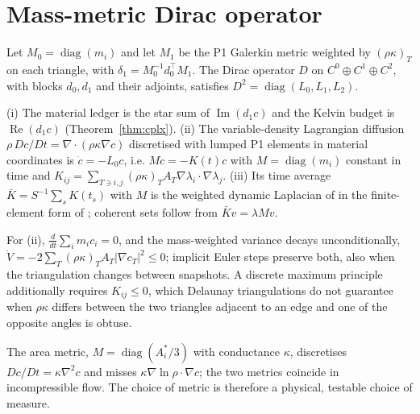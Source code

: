 \documentclass[11pt]{article}
\theoremstyle{definition}\newtheorem{definition}{Definition}\theoremstyle{remark}\newtheorem{remark}{Remark}
\newcommand{\im}{\operatorname{Im}}\newcommand{\re}{\operatorname{Re}}
\begin{document}
\section{Mass-metric Dirac operator}\label{sec:dirac}
Let $M_0=\operatorname{diag}(m_i)$ and let $M_1$ be the P1 Galerkin metric weighted by $(\rho\kappa)_T$ on each triangle, with $\delta_1=M_0^{-1}d_0^\top M_1$. The Dirac operator $D$ on $C^0\oplus C^1\oplus C^2$, with blocks $d_0,d_1$ and their adjoints, satisfies $D^2=\operatorname{diag}(L_0,L_1,L_2)$.
\begin{proposition}\label{prop:blocks}
(i) The material ledger is the star sum of $\im(d_1c)$ and the Kelvin budget is $\re(d_1c)$ (Theorem~\ref{thm:cplx}). (ii) The variable-density Lagrangian diffusion $\rho\,Dc/Dt=\nabla\cdot(\rho\kappa\nabla c)$ discretised with lumped P1 elements in material coordinates is $\dot c=-L_0c$, i.e. $M\dot c=-K(t)c$ with $M=\operatorname{diag}(m_i)$ constant in time and $K_{ij}=\sum_{T\ni i,j}(\rho\kappa)_TA_T\nabla\lambda_i\cdot\nabla\lambda_j$. (iii) Its time average $\bar K=S^{-1}\sum_sK(t_s)$ with $M$ is the weighted dynamic Laplacian of \citep{FroylandKwok2020} in the finite-element form of \citep{FroylandJunge2018}; coherent sets follow from $\bar Kv=\lambda Mv$.
\end{proposition}
\begin{proposition}
For (ii), $\frac{d}{dt}\sum_im_ic_i=0$, and the mass-weighted variance decays unconditionally, $\dot V=-2\sum_T(\rho\kappa)_TA_T|\nabla c_T|^2\le0$; implicit Euler steps preserve both, also when the triangulation changes between snapshots. A discrete maximum principle additionally requires $K_{ij}\le0$, which Delaunay triangulations do not guarantee when $\rho\kappa$ differs between the two triangles adjacent to an edge and one of the opposite angles is obtuse.
\end{proposition}
The area metric, $M=\operatorname{diag}(A^\ast_i/3)$ with conductance $\kappa$, discretises $Dc/Dt=\kappa\nabla^2c$ and misses $\kappa\nabla\ln\rho\cdot\nabla c$; the two metrics coincide in incompressible flow. The choice of metric is therefore a physical, testable choice of measure.
\end{document}
